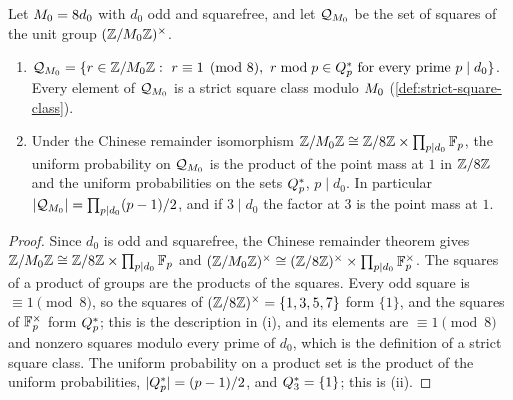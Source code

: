 \begin{lemma}\label{lem:func:unitsq}
Let $\Mzero=8d_0$ with $d_0$ odd and squarefree, and let $\Qsqmod{\Mzero}$ be
the set of squares of the unit group $(\Z/\Mzero\Z)^\times$.
\begin{enumerate}[label=(\roman*)]
\item $\Qsqmod{\Mzero}=\{r\in\Z/\Mzero\Z:\ r\equiv1\pmod8,\ r\bmod p\in\Qsq\
 \text{for every prime }p\mid d_0\}$. Every element of $\Qsqmod{\Mzero}$ is a
 strict square class modulo $\Mzero$ (\cref{def:strict-square-class}).
\item Under the Chinese remainder isomorphism
 $\Z/\Mzero\Z\cong\Z/8\Z\times\prod_{p\mid d_0}\Fp$, the uniform probability on
 $\Qsqmod{\Mzero}$ is the product of the point mass at $1$ in $\Z/8\Z$ and the
 uniform probabilities on the sets $\Qsq$, $p\mid d_0$. In particular
 $|\Qsqmod{\Mzero}|=\prod_{p\mid d_0}(p-1)/2$, and if $3\mid d_0$ the factor at
 $3$ is the point mass at $1$.
\end{enumerate}
\end{lemma}

\begin{proof}
Since $d_0$ is odd and squarefree, the Chinese remainder theorem gives
$\Z/\Mzero\Z\cong\Z/8\Z\times\prod_{p\mid d_0}\Fp$ and
$(\Z/\Mzero\Z)^\times\cong(\Z/8\Z)^\times\times\prod_{p\mid d_0}\Fp^\times$.
The squares of a product of groups are the products of the squares. Every
odd square is $\equiv1\pmod8$, so the squares of $(\Z/8\Z)^\times=\{1,3,5,7\}$
form $\{1\}$, and the squares of $\Fp^\times$ form $\Qsq$; this is the
description in (i), and its elements are $\equiv1\pmod8$ and nonzero squares
modulo every prime of $d_0$, which is the definition of a strict square
class. The uniform probability on a product set is the product of the
uniform probabilities, $|\Qsq|=(p-1)/2$, and $\Qsq[3]=\{1\}$; this is (ii).
\end{proof}


